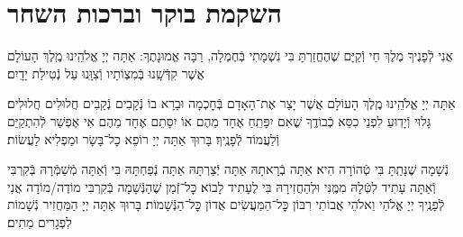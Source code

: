 \documentclass[twoside, openany, parskip=half, 11pt]{book}
\begin{document}
\renewcommand{\contentsname}{}
\tableofcontents

\clearpage



\setcounter{page}{1}

\vspace*{\fill}

\thispagestyle{empty}
\begin{Large}
\begin{center}
\end{center}
\end{Large}


\vspace*{\fill}


\centerlast

\chapter[ברכות השחר]{ השקמת בוקר וברכות השחר }

\renewcommand{\thefootnote}{\roman{footnote}} %
\setlength{\parskip}{0.75em}

\newcommand{\na}{\begin{large}
		‏‍ְ
\end{large}}

אֲנִי לְֿפָנֶיךָ מֶלֶךְ חַי וְֿקַיָּם שֶׁהֶחֱזַרְתָּ בִּי נִשְׁמָתִי בְּֿחֶמְלָה, רַבָּה אֱמוּנָתֶךָ:
אַתָּה יְיָ אֱלֹהֵֽינוּ מֶֽלֶךְ הָעוֹלָם אֲשֶׁר קִדְּֿשָֽׁנוּ בְּֿמִצְוֹתָיו וְֿצִוָּֽנוּ עַל נְֿטִילַת יָדָֽיִם׃

אַתָּה יְיָ אֱלֹהֵֽינוּ מֶֽלֶךְ הָעוֹלָם אֲשֶׁר יָצַר אֶת־הָאָדָם בְּֿחׇכְמָה וּבָרָא בוֹ נְֿקָבִים נְֿקָבִים חֲלוּלִים חֲלוּלִים׃ גָּלוּי וְֿיָדֽוּעַ לִפְנֵי כִסֵּא כְֿבוֹדֶֽךָ שֶׁאִם יִפָּתֵֽחַ אֶחָד מֵהֶם אוֹ יִסָּתֵם אֶחָד מֵהֶם אִי אֶפְשַׁר לְֿהִתְקַיֵּם וְֿלַעֲמוֹד לְֿפָנֶֽיךָ׃ בָּרוּךְ אַתָּה יְיָ רוֹפֵא כׇל־בָּשָׂר וּמַפְלִיא לַעֲשׂוֹת׃


נְֿשָׁמָה שֶׁנָּתַֽתָּ בִּי טְֿהוֹרָה הִיא׃ אַתָּה בְֿרָאתָהּ אַתָּה יְֿצַרְתָּהּ אַתָּה נְֿפַחְתָּהּ בִּי וְֿאַתָּה מְֿשַׁמְּֿרָהּ בְּֿקִרְבִּי וְֿאַתָּה עָתִיד לִטְּֿלָהּ מִמֶּֽנִּי וּלְהַחֲזִירָהּ בִּי לֶעָתִיד לָבוֹא׃ כׇּל־זְֿמַן שֶׁהַנְּֿשָׁמָה בְּֿקִרְבִּי מוֹדֶה/מוֹדָה אֲנִי לְֿפָנֶֽיךָ יְיָ אֱלֹהַי וֵאלֹהֵי אֲבוֹתַי רִבּוֹן כׇּל־הַמַּעֲשִׂים אֲדוֹן כׇּל־הַנְּֿשָׁמוֹת׃ בָּרוּךְ אַתָּה יְיָ הַמַּחֲזִיר נְֿשָׁמוֹת לִפְגָרִים מֵתִים׃
\end{document}
